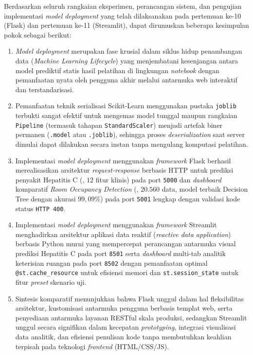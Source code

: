 \documentclass[a4paper,oneside,11pt]{book}
\begin{document}
\par Berdasarkan seluruh rangkaian eksperimen, perancangan sistem, dan pengujian implementasi \textit{model deployment} yang telah dilaksanakan pada pertemuan ke-10 (Flask) dan pertemuan ke-11 (Streamlit), dapat dirumuskan beberapa kesimpulan pokok sebagai berikut:
\begin{enumerate}[label=\arabic*.]
  \item \textit{Model deployment} merupakan fase krusial dalam siklus hidup penambangan data (\textit{Machine Learning Lifecycle}) yang menjembatani kesenjangan antara model prediktif statis hasil pelatihan di lingkungan \textit{notebook} dengan pemanfaatan nyata oleh pengguna akhir melalui antarmuka web interaktif dan terstandarisasi.
  \item Pemanfaatan teknik serialisasi Scikit-Learn menggunakan pustaka \texttt{joblib} terbukti sangat efektif untuk mengemas model tunggal maupun rangkaian \texttt{Pipeline} (termasuk tahapan \texttt{StandardScaler}) menjadi artefak biner permanen (\texttt{.model} atau \texttt{.joblib}), sehingga proses \textit{deserialization} saat server dimulai dapat dilakukan secara instan tanpa mengulang komputasi pelatihan.
  \item Implementasi \textit{model deployment} menggunakan \textit{framework} Flask berhasil merealisasikan arsitektur \textit{request-response} berbasis HTTP untuk prediksi penyakit Hepatitis C (, $12$ fitur klinis) pada port \texttt{5000} dan \textit{dashboard} komparatif \textit{Room Occupancy Detection} (, $20.560$ data, model terbaik Decision Tree dengan akurasi $99{,}09\%$) pada port \texttt{5001} lengkap dengan validasi kode status \texttt{HTTP 400}.
  \item Implementasi \textit{model deployment} menggunakan \textit{framework} Streamlit menghadirkan arsitektur aplikasi data reaktif (\textit{reactive data application}) berbasis Python murni yang mempercepat perancangan antarmuka visual prediksi Hepatitis C pada port \texttt{8501} serta \textit{dashboard} multi-tab analitik keterisian ruangan pada port \texttt{8502} dengan pemanfaatan optimal \texttt{@st.cache\_resource} untuk efisiensi memori dan \texttt{st.session\_state} untuk fitur \textit{preset} skenario uji.
  \item Sintesis komparatif menunjukkan bahwa Flask unggul dalam hal fleksibilitas arsitektur, kustomisasi antarmuka pengguna berbasis templat web, serta penyediaan antarmuka layanan RESTful skala produksi, sedangkan Streamlit unggul secara signifikan dalam kecepatan \textit{prototyping}, integrasi visualisasi data analitik, dan efisiensi penulisan kode tanpa membutuhkan keahlian terpisah pada teknologi \textit{frontend} (HTML/CSS/JS).
\end{enumerate}
\end{document}
